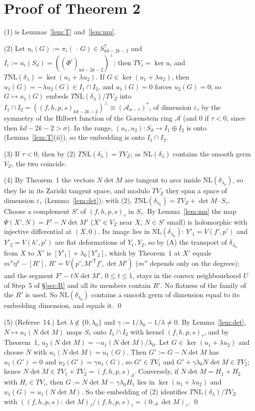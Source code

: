 \documentclass[11pt]{article}
\numberwithin{equation}{section}
\theoremstyle{remark}
\newcommand{\NL}{\mathrm{NL}}
\newcommand{\VZ}{V_Z}
\newcommand{\cA}{\mathcal{A}}
\newcommand{\T}{\mathsf{T}}
\newcommand{\lz}{\lambda_0}
\newcommand{\et}{\varepsilon_\tau}
\begin{document}
\section{Proof of Theorem 2}\label{sec:thm2}

(1) is Lemmas~\ref{lem:T} and~\ref{lem:mu}.

(2) Let $u_i(G):=\pi_i(\,\cdot\,G)\in S_{kd-2k-2}^*$ and $I_i:=u_i(S_d)=((\Phi^i)_{kd-2k-2})^\perp$; then
$TV_i=\ker u_i$ and $T\NL(\delta_\lambda)=\ker(u_1+\lambda u_2)$. If $G\in\ker(u_1+\lambda u_2)$, then
$u_1(G)=-\lambda u_2(G)\in I_1\cap I_2$, and $u_1(G)=0$ forces $u_2(G)=0$; so $G\mapsto u_1(G)$ embeds
$T\NL(\delta_\lambda)/T\VZ$ into $I_1\cap I_2=((f,h,p,s)_{kd-2k-2})^\perp\cong(\cA_{\sigma-\tau})^*$, of dimension
$\et$ by the symmetry of the Hilbert function of the Gorenstein ring $\cA$ (and $0$ if $\tau<0$, since then
$kd-2k-2>\sigma$). In the range, $(u_1,u_2):S_d\to I_1\oplus I_2$ is onto (Lemma~\ref{lem:T}(ii)), so the
embedding is onto $I_1\cap I_2$.

(3) If $\tau<0$, then by (2) $T\NL(\delta_\lambda)=T\VZ$; as $\NL(\delta_\lambda)$ contains the smooth germ
$\VZ$, the two coincide.

(4) By Theorem~1 the vectors $N\det M$ are tangent to arcs inside $\NL(\delta_{\lz})$, so they lie in its Zariski
tangent space, and modulo $T\VZ$ they span a space of dimension $\et$ (Lemma~\ref{lem:det}); with (2),
$T\NL(\delta_{\lz})=T\VZ+\det M\cdot S_\tau$. Choose a complement $S'$ of $(f,h,p,s)_\tau$ in $S_\tau$. By
Lemma~\ref{lem:mu} the map $\Psi(X',N)=F'-N\det M'$ ($X'\in\VZ$ near $X$, $N\in S'$ small) is holomorphic with
injective differential at $(X,0)$. Its image lies in $\NL(\delta_{\lz})$: $Y'_1=V(f',p')$ and $Y'_2=V(h',p')$ are
flat deformations of $Y_1,Y_2$, so by (A) the transport of $\delta_{\lz}$ from $X$ to $X'$ is
$[Y'_1]+\lz[Y'_2]$, which by Theorem~1 at $X'$ equals $m''\eta^k-[R']$, $R'=V(p',M'^\T f',\det M')$ ($m''$ depends
only on the degrees); and the segment $F'-tN\det M'$, $0\le t\le1$, stays in the convex neighbourhood $U$ of
Step~5 of \S\ref{sec:R} and all its members contain $R'$. No flatness of the family of the $R'$ is used. So
$\NL(\delta_{\lz})$ contains a smooth germ of dimension equal to its embedding dimension, and equals it. \qed

(5) (Referee~14.) Let $\lambda\notin\{0,\lz\}$ and $\gamma:=1/\lz-1/\lambda\ne0$. By Lemma~\ref{lem:det},
$N\mapsto u_1(N\det M)$ maps $S_\tau$ onto $I_1\cap I_2$ with kernel $(f,h,p,s)_\tau$, and by Theorem~1,
$u_2(N\det M)=-u_1(N\det M)/\lz$. Let $G\in\ker(u_1+\lambda u_2)$ and choose $N$ with $u_1(N\det M)=u_1(G)$. Then
$G':=G-N\det M$ has $u_1(G')=0$ and $u_2(G')=\gamma u_1(G)$, so $G'\in TV_1$ and $G'+\gamma\lz N\det M\in TV_2$; hence
$N\det M\in TV_1+TV_2=(f,h,p,s)_d$. Conversely, if $N\det M=H_1+H_2$ with $H_i\in TV_i$, then
$G:=N\det M-\gamma\lz H_1$ lies in $\ker(u_1+\lambda u_2)$ and $u_1(G)=u_1(N\det M)$. So the embedding of (2)
identifies $T\NL(\delta_\lambda)/T\VZ$ with $((f,h,p,s):\det M)_\tau/(f,h,p,s)_\tau=(0:_\cA\det M)_\tau$. \qed
\end{document}
